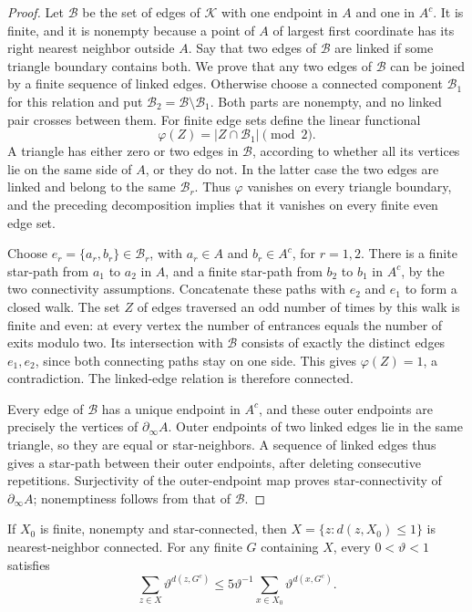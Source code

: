 \begin{proof}
Let \(\mathcal B\) be the set of edges of \(\mathcal K\)
with one endpoint in \(A\) and one in \(A^c\).  It is finite,
and it is nonempty because a point of \(A\) of largest first
coordinate has its right nearest neighbor outside \(A\).
Say that two edges of \(\mathcal B\) are linked if some
triangle boundary contains both.  We prove that any two
edges of \(\mathcal B\) can be joined by a finite sequence
of linked edges.  Otherwise choose a connected component
\(\mathcal B_1\) for this relation and put
\(\mathcal B_2=\mathcal B\setminus\mathcal B_1\).
Both parts are nonempty, and no linked pair crosses between
them.  For finite edge sets define the linear functional
\[
              \varphi(Z)=|Z\cap\mathcal B_1|\pmod2.
\]
A triangle has either zero or two edges in \(\mathcal B\),
according to whether all its vertices lie on the same side
of \(A\), or they do not.  In the latter case the two edges
are linked and belong to the same \(\mathcal B_r\).
Thus \(\varphi\) vanishes on every triangle boundary, and
the preceding decomposition implies that it vanishes on
every finite even edge set.

Choose \(e_r=\{a_r,b_r\}\in\mathcal B_r\), with
\(a_r\in A\) and \(b_r\in A^c\), for \(r=1,2\).
There is a finite star-path from \(a_1\) to \(a_2\) in
\(A\), and a finite star-path from \(b_2\) to \(b_1\)
in \(A^c\), by the two connectivity assumptions.
Concatenate these paths with \(e_2\) and \(e_1\) to form
a closed walk.  The set \(Z\) of edges traversed an odd
number of times by this walk is finite and even: at every
vertex the number of entrances equals the number of exits
modulo two.  Its intersection with \(\mathcal B\) consists
of exactly the distinct edges \(e_1,e_2\), since both
connecting paths stay on one side.  This gives
\(\varphi(Z)=1\), a contradiction.  The linked-edge relation
is therefore connected.

Every edge of \(\mathcal B\) has a unique endpoint in
\(A^c\), and these outer endpoints are precisely the
vertices of \(\partial_\infty A\).  Outer endpoints of
two linked edges lie in the same triangle, so they are
equal or star-neighbors.  A sequence of linked edges
thus gives a star-path between their outer endpoints,
after deleting consecutive repetitions.  Surjectivity of
the outer-endpoint map proves star-connectivity of
\(\partial_\infty A\); nonemptiness follows from that of
\(\mathcal B\).
\end{proof}

\begin{lemma}\label{l:thicken}
If \(X_0\) is finite, nonempty and star-connected, then
\(X=\{z:d(z,X_0)\le1\}\) is nearest-neighbor connected.
For any finite \(G\) containing \(X\), every \(0<\vartheta<1\)
satisfies
\[
 \sum_{z\in X}\vartheta^{d(z,G^c)}
       \le5\vartheta^{-1}
                      \sum_{x\in X_0}\vartheta^{d(x,G^c)}.
\]
\end{lemma}


